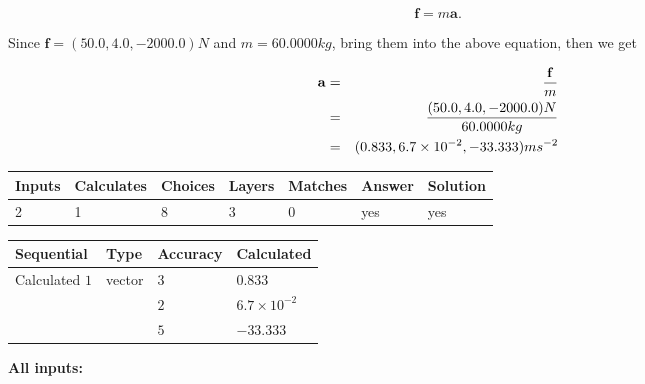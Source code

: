 \documentclass[12pt]{article}
\begin{document}
\[
\mathbf{f}=m\mathbf{a}.
\]
 
Since $\mathbf{f}= %
(50.0 , 4.0 , -2000.0) N$
and $m= %
60.0000kg$, bring them into the above equation, then we get
 
\begin{eqnarray*}
\mathbf{a}&=&\frac{\mathbf{f}}m  \\
&=&\frac{ %
(50.0 , 4.0 , -2000.0) N}{ %
60.0000kg}  \\
&=& %
(0.833 , 6.7 \times 10^{-2} , -33.333) ms^{-2}
\end{eqnarray*}
 
 
 
\noindent{}
 
 

 
\vspace{0.3in}
   
   
   
   
\noindent\begin{tabular}{|l|l|l|l|l|l|l|}
 \hline
Inputs & Calculates & Choices & Layers & Matches & Answer & Solution \\ \hline
           2  & 
           1  & 
           8
  & 
           3  & 
           0  & 
  yes & 
  yes 
  \\ \hline
 \end{tabular}
   
   
   
   
\noindent{}
   
   
  
  
\noindent\begin{tabular}{|l|l|l|l|}
\hline
 Sequential & Type & Accuracy & Calculated \\ 
\hline
 
 
  Calculated $            1 $ & vector &  
  $            3  $ 
 &  $ 0.833 $ 
 \\    
  & & 
  $            2  $ 
 &  $ 6.7 \times 10^{-2} $ 
 \\    
  & & 
  $            5  $ 
 &  $ -33.333 $ 
 \\  \hline  
 \end{tabular}
   
   
   
   
\noindent\vspace{0.1in}\hspace{-0.08in} {\textbf{\Large{All inputs: }}}
   
\end{document}

